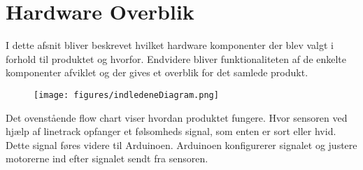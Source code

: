 \section{Hardware Overblik}

I dette afsnit bliver beskrevet hvilket hardware komponenter der blev valgt i forhold til produktet og hvorfor. Endvidere bliver funktionaliteten af de enkelte komponenter afviklet og der gives et overblik for det samlede produkt.

\begin{figure}[h!]
  \centering
  \texttt{[image: figures/indledeneDiagram.png]}
\end{figure}

Det ovenstående flow chart viser hvordan produktet fungere. Hvor sensoren ved hjælp af linetrack opfanger et følsomheds signal, som enten er sort eller hvid. Dette signal føres videre til Arduinoen. Arduinoen konfigurerer signalet og justere motorerne ind efter signalet sendt fra sensoren.